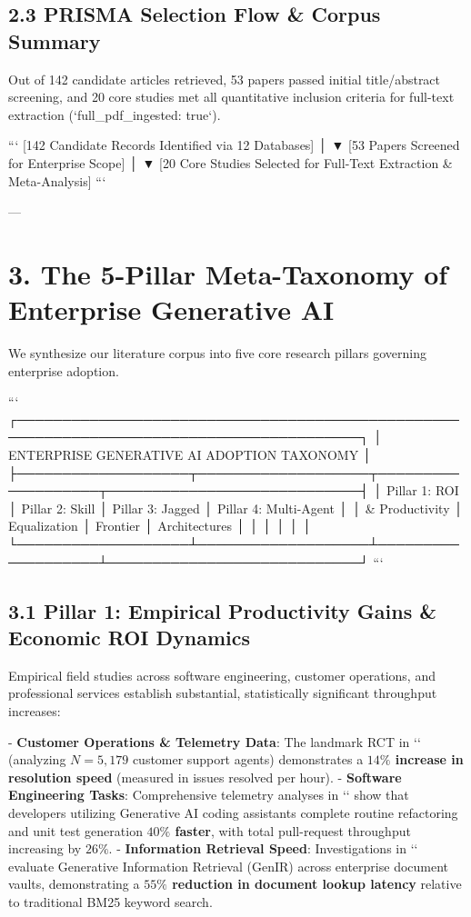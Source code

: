 \documentclass[10pt,journal,compsoc,twocolumn]{IEEEtran}
\begin{document}
\subsection{2.3 PRISMA Selection Flow & Corpus Summary}
Out of 142 candidate articles retrieved, 53 papers passed initial title/abstract screening, and 20 core studies met all quantitative inclusion criteria for full-text extraction (`full_pdf_ingested: true`).

```
  [142 Candidate Records Identified via 12 Databases]
                          │
                          ▼
       [53 Papers Screened for Enterprise Scope]
                          │
                          ▼
  [20 Core Studies Selected for Full-Text Extraction & Meta-Analysis]
```

---

\section{3. The 5-Pillar Meta-Taxonomy of Enterprise Generative AI}

We synthesize our literature corpus into five core research pillars governing enterprise adoption.

```
┌────────────────────────────────────────────────────────────────────────────────────────┐
│                   ENTERPRISE GENERATIVE AI ADOPTION TAXONOMY                           │
├───────────────────┬───────────────────┬───────────────────┬────────────────────────────┤
│ Pillar 1: ROI     │ Pillar 2: Skill   │ Pillar 3: Jagged  │ Pillar 4: Multi-Agent      │
│    & Productivity │    Equalization   │    Frontier       │    Architectures           │
│   \cite{crossref_10.2139_ssrn.5260645}│   \cite{openalex_W4360620450} │   \cite{crossref_10.2139_ssrn.6685720}│   \cite{github_nsharma36_product-owner-ai-toolkit}    │
└───────────────────┴───────────────────┴───────────────────┴────────────────────────────┘
```

\subsection{3.1 Pillar 1: Empirical Productivity Gains & Economic ROI Dynamics}
Empirical field studies across software engineering, customer operations, and professional services establish substantial, statistically significant throughput increases:

- \textbf{Customer Operations & Telemetry Data}: The landmark RCT in `\cite{crossref_10.2139_ssrn.5260645}` (analyzing $N = 5,179$ customer support agents) demonstrates a \textbf{$14\%$ increase in resolution speed} (measured in issues resolved per hour).
- \textbf{Software Engineering Tasks}: Comprehensive telemetry analyses in `\cite{openalex_W4400578758}` show that developers utilizing Generative AI coding assistants complete routine refactoring and unit test generation \textbf{$40\%$ faster}, with total pull-request throughput increasing by $26\%$.
- \textbf{Information Retrieval Speed}: Investigations in `\cite{arxiv_2501.02842}` evaluate Generative Information Retrieval (GenIR) across enterprise document vaults, demonstrating a \textbf{$55\%$ reduction in document lookup latency} relative to traditional BM25 keyword search.
\end{document}
